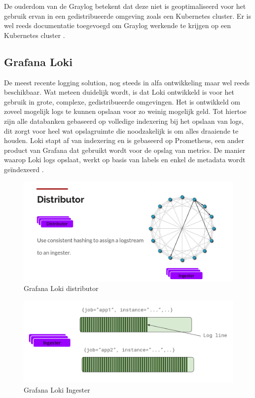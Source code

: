 De ouderdom van de Graylog betekent dat deze niet is geoptimaliseerd voor het gebruik ervan in een gedistribueerde omgeving zoals een Kubernetes cluster. Er is wel reeds documentatie toegevoegd om Graylog werkende te krijgen op een Kubernetes cluster \autocite{lumiq2017}.  

\subsection{Grafana Loki}
De meest recente logging solution, nog steeds in alfa ontwikkeling maar wel reeds beschikbaar. Wat meteen duidelijk wordt, is dat Loki ontwikkeld is voor het gebruik in grote, complexe, gedistribueerde omgevingen. Het is ontwikkeld om zoveel mogelijk logs te kunnen opslaan voor zo weinig mogelijk geld. Tot hiertoe zijn alle databanken gebaseerd op volledige indexering bij het opslaan van logs, dit zorgt voor heel wat opslagruimte die noodzakelijk is om alles draaiende te houden. Loki stapt af van indexering en is gebaseerd op Prometheus, een ander product van Grafana dat gebruikt wordt voor de opslag van metrics. De manier waarop Loki logs opslaat, werkt op basis van labels en enkel de metadata wordt geïndexeerd \autocite{oleksii2019}.

\begin{figure}[ht]
    \includegraphics[scale=0.3]{img/loki_distributor}
    \caption[Grafana Loki distributor]{Grafana Loki distributor \cite{loki}}
\end{figure}

\begin{figure}[ht]
    \includegraphics[scale=0.3]{img/loki_ingester}
    \caption[Grafana Loki Ingester]{Grafana Loki Ingester \cite{loki}}
\end{figure}

